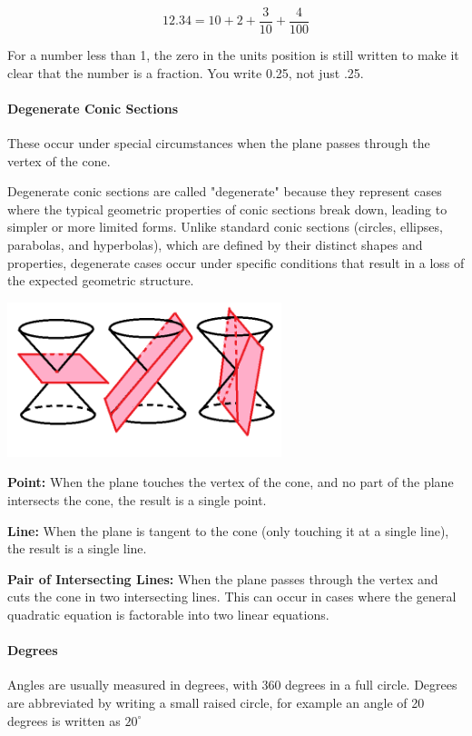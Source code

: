 \documentclass[12pt]{article}
\begin{document}
$$12.34 = 10 + 2 + \frac{3}{10} + \frac{4}{100}$$

For a number less than 1, the zero in the units position is still written to make it clear that the number is a fraction. You write 0.25, not just .25.

\paragraph{Degenerate Conic Sections}
These occur under special circumstances when the plane passes through the vertex of the cone.

Degenerate conic sections are called "degenerate" because they represent cases where the typical geometric properties of conic sections break down, leading to simpler or more limited forms. Unlike standard conic sections (circles, ellipses, parabolas, and hyperbolas), which are defined by their distinct shapes and properties, degenerate cases occur under specific conditions that result in a loss of the expected geometric structure.

\begin{center}
\includegraphics[width=0.6\textwidth]{degenerate conic sections.png}
\end{center}

\textbf{Point:} When the plane touches the vertex of the cone, and no part of the plane intersects the cone, the result is a single point.

\textbf{Line:} When the plane is tangent to the cone (only touching it at a single line), the result is a single line.

\textbf{Pair of Intersecting Lines:} When the plane passes through the vertex and cuts the cone in two intersecting lines. This can occur in cases where the general quadratic equation is factorable into two linear equations.

\paragraph{Degrees} Angles are usually measured in degrees, with 360 degrees in a full circle. Degrees are abbreviated by writing a small raised circle, for example an angle of 20 degrees is written as $20^\circ$
\end{document}
